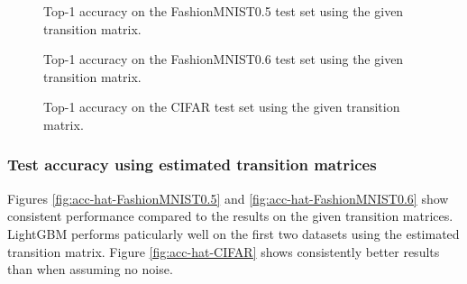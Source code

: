 \documentclass{article} %
\begin{document}
\begin{figure}\caption{
  Top-1 accuracy on the FashionMNIST0.5 test set using the given transition matrix.
  \label{fig:acc-FashionMNIST0.5}
}\end{figure}

\begin{figure}\caption{
  Top-1 accuracy on the FashionMNIST0.6 test set using the given transition matrix.
  \label{fig:acc-FashionMNIST0.6}
}\end{figure}

\begin{figure}\caption{
  Top-1 accuracy on the CIFAR test set using the given transition matrix.
  \label{fig:acc-CIFAR}
}\end{figure}

\subsubsection{Test accuracy using estimated transition matrices}
Figures \ref{fig:acc-hat-FashionMNIST0.5} and \ref{fig:acc-hat-FashionMNIST0.6} show consistent performance compared to the results on the given transition matrices. LightGBM performs paticularly well on the first two datasets using the estimated transition matrix. Figure \ref{fig:acc-hat-CIFAR} shows consistently better results than when assuming no noise.
\end{document}
